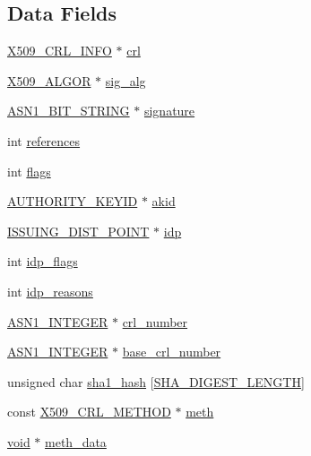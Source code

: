 \subsection*{Data Fields}
\begin{DoxyCompactItemize}
\item 
\hyperlink{crypto_2x509_2x509_8h_a1e216f160dc7df7dcd81665a2579c027}{X509\+\_\+\+C\+R\+L\+\_\+\+I\+N\+FO} $\ast$ \hyperlink{struct_x509__crl__st_a18aa10f40a90a749e4b14a166177fa7b}{crl}
\item 
\hyperlink{crypto_2ossl__typ_8h_aa2b6185e6254f36f709cd6577fb5022e}{X509\+\_\+\+A\+L\+G\+OR} $\ast$ \hyperlink{struct_x509__crl__st_a48635ef8176d7ad1ab56a1088f7321fb}{sig\+\_\+alg}
\item 
\hyperlink{crypto_2ossl__typ_8h_af837aaa00e151b1e8773aea5a8fe1cc4}{A\+S\+N1\+\_\+\+B\+I\+T\+\_\+\+S\+T\+R\+I\+NG} $\ast$ \hyperlink{struct_x509__crl__st_a0ded22400c40848a864a98aeb7946f1a}{signature}
\item 
int \hyperlink{struct_x509__crl__st_a146fdb34d9a909e530adf8b189481195}{references}
\item 
int \hyperlink{struct_x509__crl__st_ac8bf36fe0577cba66bccda3a6f7e80a4}{flags}
\item 
\hyperlink{crypto_2ossl__typ_8h_a27c88725cd81ecf750f668814507bc8d}{A\+U\+T\+H\+O\+R\+I\+T\+Y\+\_\+\+K\+E\+Y\+ID} $\ast$ \hyperlink{struct_x509__crl__st_a08ed0324382dcedeff14b415417cd511}{akid}
\item 
\hyperlink{crypto_2ossl__typ_8h_a94e93ada81a13517c3c801f8cc36b960}{I\+S\+S\+U\+I\+N\+G\+\_\+\+D\+I\+S\+T\+\_\+\+P\+O\+I\+NT} $\ast$ \hyperlink{struct_x509__crl__st_a26aba55480dcadba46946dd771292316}{idp}
\item 
int \hyperlink{struct_x509__crl__st_af51a11c5cb7464597c4c2db0690b989c}{idp\+\_\+flags}
\item 
int \hyperlink{struct_x509__crl__st_ab3335a5e27ef559e6d246131165b1917}{idp\+\_\+reasons}
\item 
\hyperlink{crypto_2ossl__typ_8h_af4335399bf9774cb410a5e93de65998b}{A\+S\+N1\+\_\+\+I\+N\+T\+E\+G\+ER} $\ast$ \hyperlink{struct_x509__crl__st_a47b53ceb13aa7141ae34a15eac2377aa}{crl\+\_\+number}
\item 
\hyperlink{crypto_2ossl__typ_8h_af4335399bf9774cb410a5e93de65998b}{A\+S\+N1\+\_\+\+I\+N\+T\+E\+G\+ER} $\ast$ \hyperlink{struct_x509__crl__st_a73cc1c53404b105cf52f1bf56010bc34}{base\+\_\+crl\+\_\+number}
\item 
unsigned char \hyperlink{struct_x509__crl__st_a6ed2c3bc0848dcff0d9d3ebe8ba5273a}{sha1\+\_\+hash} \mbox{[}\hyperlink{include_2openssl_2sha_8h_a1a715db7b4403fe6c165e49a32f5fe3d}{S\+H\+A\+\_\+\+D\+I\+G\+E\+S\+T\+\_\+\+L\+E\+N\+G\+TH}\mbox{]}
\item 
const \hyperlink{crypto_2ossl__typ_8h_abb64dd84972455ab16dc53699f157924}{X509\+\_\+\+C\+R\+L\+\_\+\+M\+E\+T\+H\+OD} $\ast$ \hyperlink{struct_x509__crl__st_a28e28c5c76d9e1ee6debacf618e06fc2}{meth}
\item 
\hyperlink{hw__4758__cca_8h_afad4d591c7931ff6dc5bf69c76c96aa0}{void} $\ast$ \hyperlink{struct_x509__crl__st_abb3014ed4d11f8b0d1e88bc8ba42fd83}{meth\+\_\+data}
\end{DoxyCompactItemize}


